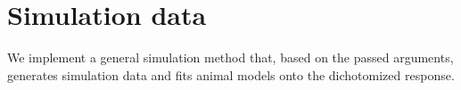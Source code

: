 \begin{Shaded}
\begin{Highlighting}[]
\OtherTok{\textless{}{-}}\NormalTok{ (} \SpecialCharTok{/}\NormalTok{ samples[, }\NormalTok{]) }\SpecialCharTok{/}
\NormalTok{\}}

\OtherTok{\textless{}{-}} 
\SpecialCharTok{*}\NormalTok{ (} \SpecialCharTok{{-}}\SpecialCharTok{/}\NormalTok{ (}\NormalTok{(}\SpecialCharTok{\^{}}
\NormalTok{\}}
\end{Highlighting}
\end{Shaded}

\hypertarget{simulation-data}{%
\section*{Simulation data}\label{simulation-data}}

We implement a general simulation method that, based on the passed
arguments, generates simulation data and fits animal models onto the
dichotomized response.

